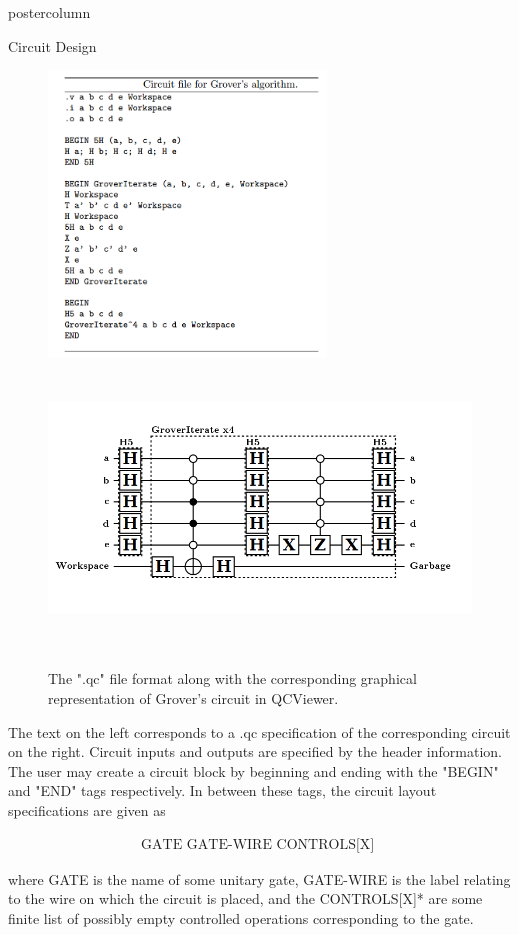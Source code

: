 \documentclass[final]{beamer} %
\begin{document}
\begin{frame}{}
\begin{columns}
\begin{column}{.33\textwidth}
\begin{beamercolorbox}[center,wd=\textwidth]{postercolumn}
\begin{minipage}[T]{.95\textwidth}
\begin{block}{\large Circuit Design}
             \centering 
		\begin{figure}[!htbp]
		  \centering
		  \includegraphics[height=3in]{figures/Grover_Text.png} \ \ \ \  \includegraphics[height=3in]{figures/Grover_Circuit.png}
		  \caption{The ".qc" file format along with the corresponding graphical representation of Grover's circuit in QCViewer.}
		\end{figure}

The text on the left corresponds to a .qc specification of the corresponding circuit on the right. Circuit inputs and outputs are specified by the header information. The user may create a circuit block by beginning and ending with the "BEGIN" and "END" tags respectively. In between these tags, the circuit layout specifications are given as

\begin{align*}
\text{GATE \ GATE-WIRE \ CONTROLS[X] }
\end{align*}

where GATE is the name of some unitary gate, GATE-WIRE is the label relating to the wire on which the circuit is placed, and the CONTROLS[X]* are some finite list of possibly empty controlled operations corresponding to the gate.


\end{block}
\end{minipage}
\end{beamercolorbox}
\end{column}
\end{columns}
\end{frame}
\end{document}
